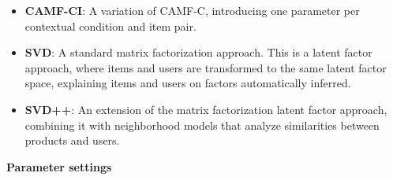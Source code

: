 \begin{itemize}
    \item \textbf{CAMF-CI}: A variation of CAMF-C, introducing one parameter per contextual condition and item pair.
    \item \textbf{SVD}: A standard matrix factorization approach. This is a latent factor approach, where items and users are transformed to the same latent factor space, explaining items and users on factors automatically inferred.
    \item \textbf{SVD++}: An extension of the matrix factorization latent factor approach, combining it with neighborhood models that analyze similarities between products and users.
\end{itemize}
\textbf{Parameter settings}\\
